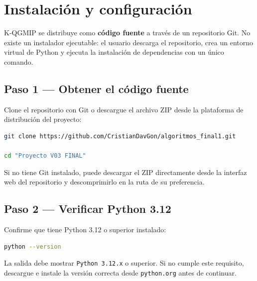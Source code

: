 
\section{Instalación y configuración}
\label{sec:instalacion}

K-QGMIP se distribuye como \textbf{código fuente} a través de un repositorio Git.
No existe un instalador ejecutable: el usuario descarga el repositorio, crea un entorno
virtual de Python y ejecuta la instalación de dependencias con un único comando.

\subsection{Paso 1 — Obtener el código fuente}

Clone el repositorio con Git o descargue el archivo ZIP desde la plataforma de distribución
del proyecto:

\begin{lstlisting}[language=bash]
git clone https://github.com/CristianDavGon/algoritmos_final1.git

cd "Proyecto V03 FINAL"
\end{lstlisting}

Si no tiene Git instalado, puede descargar el ZIP directamente desde la interfaz web del
repositorio y descomprimirlo en la ruta de su preferencia.

\subsection{Paso 2 — Verificar Python 3.12}

Confirme que tiene Python 3.12 o superior instalado:

\begin{lstlisting}[language=bash]
python --version
\end{lstlisting}

La salida debe mostrar \texttt{Python 3.12.x} o superior. Si no cumple este requisito,
descargue e instale la versión correcta desde \texttt{python.org} antes de continuar.

